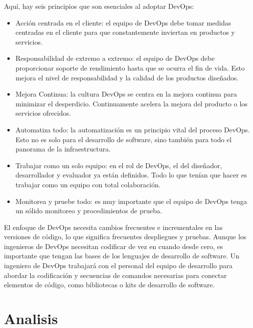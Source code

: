\documentclass[preprint,12pt]{elsarticle}
\begin{document}
Aquí, hay seis principios que son esenciales al adoptar DevOps:

\begin{itemize}

\item Acción centrada en el cliente: el equipo de DevOps debe tomar medidas centradas en el cliente para que constantemente inviertan en productos y servicios.
\item Responsabilidad de extremo a extremo: el equipo de DevOps debe proporcionar soporte de rendimiento hasta que se ocurra el fin de vida. Esto mejora el nivel de responsabilidad y la calidad de los productos diseñados.
\item Mejora Continua: la cultura DevOps se centra en la mejora continua para minimizar el desperdicio. Continuamente acelera la mejora del producto o los servicios ofrecidos.
\item Automatiza todo: la automatización es un principio vital del proceso DevOps. Esto no es solo para el desarrollo de software, sino también para todo el panorama de la infraestructura.
\item Trabajar como un solo equipo: en el rol de DevOps, el del diseñador, desarrollador y evaluador ya están definidos. Todo lo que tenían que hacer es trabajar como un equipo con total colaboración.
\item Monitorea y pruebe todo: es muy importante que el equipo de DevOps tenga un sólido monitoreo y procedimientos de prueba.

\end{itemize}

El enfoque de DevOps necesita cambios frecuentes e incrementales en las versiones de código, lo que significa frecuentes despliegues y pruebas.
Aunque los ingenieros de DevOps necesitan codificar de vez en cuando desde cero, es importante que tengan las bases de los lenguajes de desarrollo de software.
Un ingeniero de DevOps trabajará con el personal del equipo de desarrollo para abordar la codificación y secuencias de comandos necesarias para conectar elementos de código, como bibliotecas o kits de desarrollo de software.





\section{Analisis}
\end{document}
